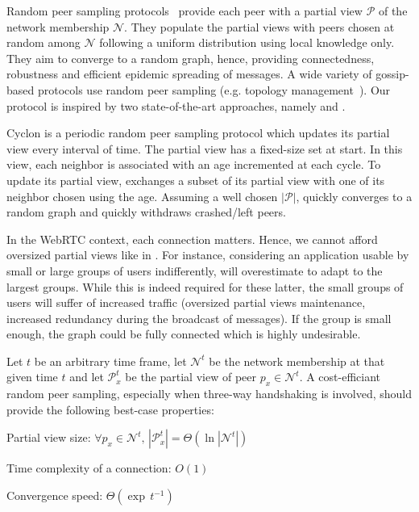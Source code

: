 \begin{asparadesc}
\item [Random peer sampling] protocols~\cite{jelasity2004peer} provide each
  peer with a partial view $\mathcal{P}$ of the network membership
  $\mathcal{N}$. They populate the partial views with peers chosen at random
  among $\mathcal{N}$ following a uniform distribution using local knowledge
  only. They aim to converge to a random graph, hence, providing connectedness,
  robustness and efficient epidemic spreading of messages. A wide variety of
  gossip-based protocols use random peer sampling (e.g. topology
  management~\cite{voulgaris2005epidemic, jelasity2009tman,dabek2004vivaldi}).
  Our \SCAMPLON{} protocol is inspired by two state-of-the-art approaches,
  namely \SCAMP{} and \CYCLON{}.
\end{asparadesc}

\begin{asparadesc}
\item [Cyclon]\cite{voulgaris2005cyclon} is a periodic random peer sampling
  protocol which updates its partial view every interval of time. The partial
  view has a fixed-size set at start. In this view, each neighbor is
  associated with an age incremented at each cycle. To update its partial view,
  \CYCLON{} exchanges a subset of its partial view with one of its neighbor
  chosen using the age.  Assuming a well chosen $|\mathcal{P}|$, \CYCLON{}
  quickly converges to a random graph and quickly withdraws crashed/left peers.

  In the WebRTC context, each connection matters. Hence, we cannot afford
  oversized partial views like in \CYCLON{}. For instance, considering an
  application usable by small or large groups of users indifferently, \CYCLON{}
  will overestimate to adapt to the largest groups. While this is indeed
  required for these latter, the small groups of users will suffer of increased
  traffic (oversized partial views maintenance, increased redundancy during the
  broadcast of messages). If the group is small enough, the graph could be
  fully connected which is highly undesirable.
\end{asparadesc}


\begin{problem}
  Let $t$ be an arbitrary time frame, let $\mathcal{N}^t$ be the network
  membership at that given time $t$ and let $\mathcal{P}_x^t$ be the partial view of peer $p_x \in \mathcal{N}^t$. 
  A cost-efficiant random peer sampling, especially when three-way handshaking is
  involved, should provide the following best-case properties:
  \begin{center}
    Partial view size: \hfill
    $\forall p_x \in \mathcal{N}^t,\, |\mathcal{P}_x^t| = \Theta (\ln
    |\mathcal{N}^t|)$
  \end{center}
  \begin{center}
    Time complexity of a connection: \hfill $O(1)$
  \end{center}
  \begin{center}
    Convergence speed: \hfill $\Theta(\exp \, t^{-1})$
  \end{center}
\end{problem}

